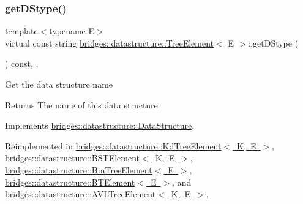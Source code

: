 \subsubsection{\texorpdfstring{getDStype()}{getDStype()}}
{\footnotesize\ttfamily template$<$typename E$>$ \\
virtual const string \mbox{\hyperlink{classbridges_1_1datastructure_1_1_tree_element}{bridges\+::datastructure\+::\+Tree\+Element}}$<$ E $>$\+::get\+D\+Stype (\begin{DoxyParamCaption}{ }\end{DoxyParamCaption}) const\hspace{0.3cm}{\ttfamily [inline]}, {\ttfamily [override]}, {\ttfamily [virtual]}}

Get the data structure name \begin{DoxyReturn}{Returns}
The name of this data structure 
\end{DoxyReturn}


Implements \mbox{\hyperlink{classbridges_1_1datastructure_1_1_data_structure_a4ff66cb34409f11fe9fc647f6d8a22ce}{bridges\+::datastructure\+::\+Data\+Structure}}.



Reimplemented in \mbox{\hyperlink{classbridges_1_1datastructure_1_1_kd_tree_element_a76f6d9bfadfdec09d0a8564aa0e33235}{bridges\+::datastructure\+::\+Kd\+Tree\+Element$<$ K, E $>$}}, \mbox{\hyperlink{classbridges_1_1datastructure_1_1_b_s_t_element_a2bb8cc9ec4b6bc5b89ecef0f17be366f}{bridges\+::datastructure\+::\+B\+S\+T\+Element$<$ K, E $>$}}, \mbox{\hyperlink{classbridges_1_1datastructure_1_1_bin_tree_element_aef86e3663785972251547e409fdc757b}{bridges\+::datastructure\+::\+Bin\+Tree\+Element$<$ E $>$}}, \mbox{\hyperlink{classbridges_1_1datastructure_1_1_b_t_element_a2118b6b74f3fe0fec39e3b258a7dee89}{bridges\+::datastructure\+::\+B\+T\+Element$<$ E $>$}}, and \mbox{\hyperlink{classbridges_1_1datastructure_1_1_a_v_l_tree_element_ab04d1e9ad4630e408041e8137dc9854a}{bridges\+::datastructure\+::\+A\+V\+L\+Tree\+Element$<$ K, E $>$}}.

\mbox{\label{classbridges_1_1datastructure_1_1_tree_element_ad894ec5edfa66ddf59dd83a8712b48f1}} 

